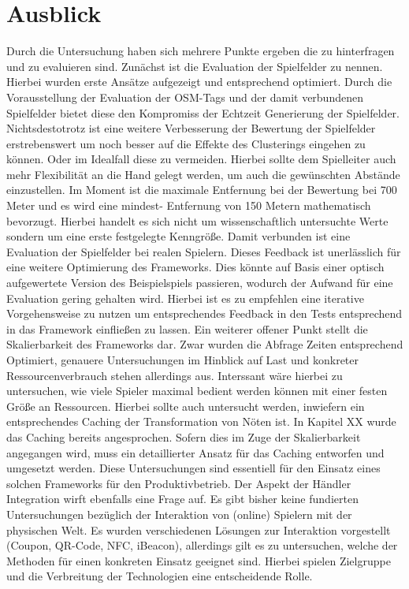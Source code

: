 \section{Ausblick}

Durch die Untersuchung haben sich mehrere Punkte ergeben die zu hinterfragen und zu evaluieren sind. Zunächst ist die Evaluation der Spielfelder zu nennen. Hierbei wurden erste Ansätze aufgezeigt und entsprechend optimiert. Durch die Vorausstellung der Evaluation der OSM-Tags und der damit verbundenen Spielfelder bietet diese den Kompromiss der Echtzeit Generierung der Spielfelder. Nichtsdestotrotz ist eine weitere Verbesserung der Bewertung der Spielfelder erstrebenswert um noch besser auf die Effekte des Clusterings eingehen zu können. Oder im Idealfall diese zu vermeiden. Hierbei sollte dem Spielleiter auch mehr Flexibilität an die Hand gelegt werden, um auch die gewünschten Abstände einzustellen. Im Moment ist die maximale Entfernung bei der Bewertung bei 700 Meter und es wird eine mindest- Entfernung von 150 Metern  mathematisch bevorzugt. Hierbei handelt es sich nicht um wissenschaftlich untersuchte Werte sondern um eine erste festgelegte Kenngröße.
Damit verbunden ist eine Evaluation der Spielfelder bei realen Spielern. Dieses Feedback ist unerlässlich für eine weitere Optimierung des Frameworks. Dies könnte auf Basis einer optisch aufgewertete Version des Beispielspiels passieren, wodurch der Aufwand für eine Evaluation gering gehalten wird.
Hierbei ist es zu empfehlen eine iterative Vorgehensweise zu nutzen um entsprechendes Feedback in den Tests entsprechend in das Framework einfließen zu lassen.
Ein weiterer offener Punkt stellt die Skalierbarkeit des Frameworks dar. Zwar wurden die Abfrage Zeiten entsprechend Optimiert, genauere Untersuchungen im Hinblick auf Last und konkreter Ressourcenverbrauch stehen allerdings aus. Interssant wäre hierbei zu untersuchen, wie viele Spieler maximal bedient werden können mit einer festen Größe an Ressourcen. Hierbei sollte auch untersucht werden, inwiefern ein entsprechendes Caching der Transformation von Nöten ist. In Kapitel XX wurde das Caching bereits angesprochen. Sofern dies im Zuge der Skalierbarkeit angegangen wird, muss ein detaillierter Ansatz für das Caching entworfen und umgesetzt werden. 
Diese Untersuchungen sind essentiell für den Einsatz eines solchen Frameworks für den Produktivbetrieb.
Der Aspekt der Händler Integration wirft ebenfalls eine Frage auf. Es gibt bisher keine fundierten Untersuchungen bezüglich der Interaktion von (online) Spielern mit der physischen Welt. Es wurden verschiedenen Lösungen zur Interaktion vorgestellt (Coupon, QR-Code, NFC, iBeacon), allerdings gilt es zu untersuchen, welche der Methoden für einen konkreten Einsatz geeignet sind. Hierbei spielen Zielgruppe und die Verbreitung der Technologien eine entscheidende Rolle.